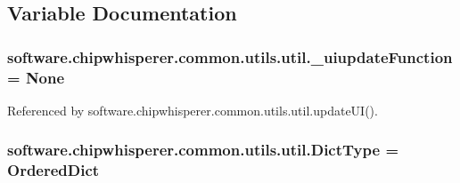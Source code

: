 \subsection{Variable Documentation}
\hypertarget{namespacesoftware_1_1chipwhisperer_1_1common_1_1utils_1_1util_adc2daa599b24498a339b01ed819bca3d}{}
\subsubsection[{\+\_\+uiupdate\+Function}]{\setlength{\rightskip}{0pt plus 5cm}software.\+chipwhisperer.\+common.\+utils.\+util.\+\_\+uiupdate\+Function = None}\label{namespacesoftware_1_1chipwhisperer_1_1common_1_1utils_1_1util_adc2daa599b24498a339b01ed819bca3d}


Referenced by software.\+chipwhisperer.\+common.\+utils.\+util.\+update\+U\+I().

\hypertarget{namespacesoftware_1_1chipwhisperer_1_1common_1_1utils_1_1util_aa256ae974052a2cfddc80fd21216b08d}{}
\subsubsection[{Dict\+Type}]{\setlength{\rightskip}{0pt plus 5cm}software.\+chipwhisperer.\+common.\+utils.\+util.\+Dict\+Type = Ordered\+Dict}\label{namespacesoftware_1_1chipwhisperer_1_1common_1_1utils_1_1util_aa256ae974052a2cfddc80fd21216b08d}
